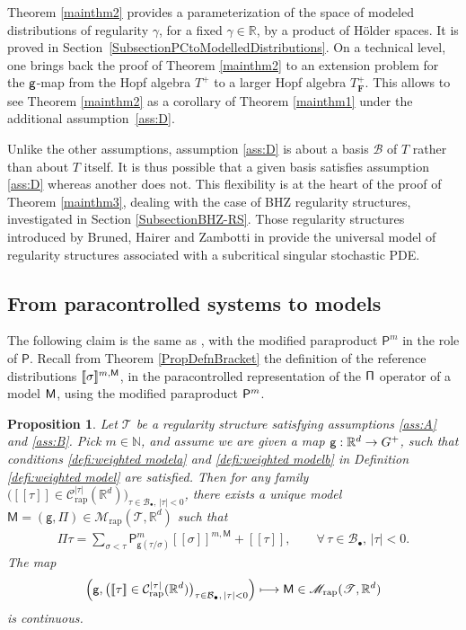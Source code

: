 \documentclass[JEP,XML,SOM,Unicode,published]{cedram}
\newcommand\mto{\mathchoice{\longmapsto}{\mapsto}{\mapsto}{\mapsto}}
\newcommand{\sbullet}{{\scriptscriptstyle\bullet}}
\theoremstyle{plain}
\newtheorem{prop}[thm]{Proposition}
\theoremstyle{definition}
\newcommand{\Brac}[1]{[\![#1]\!]}
\newcommand{\rap}{\mathrm{rap}}
\newcommand{\sfM}{\mathsf{M}}
\newcommand{\sfP}{\mathsf{P}}
\newcommand{\sfg}{\mathsf{g}}
\newcommand{\sfPi}{\mathsf{\Pi}}
\newcommand{\bsF}{\boldsymbol{F}}
\newcommand{\scrM}{\mathscr{M}}
\newcommand{\scrT}{\mathscr{T}}
\newcommand{\bbN}{\mathbb{N}}
\newcommand{\bbR}{\mathbb{R}}
\newcommand{\mcB}{\mathcal{B}}
\newcommand{\mcC}{\mathcal{C}}
\begin{document}
Theorem \ref{mainthm2} provides a parameterization of the space of modeled distributions of regularity $\gamma$, for a fixed $\gamma\in\bbR$, by a product of Hölder spaces. It is proved in Section~\ref{SubsectionPCtoModelledDistributions}. On a technical level, one brings back the proof of Theorem \ref{mainthm2} to an extension problem for the $\sf g$-map from the Hopf algebra $T^+$ to a larger Hopf algebra $T^+_{\bsF}$. This allows to see Theorem \ref{mainthm2} as a corollary of Theorem \ref{mainthm1} under the additional assumption~\eqref{ass:D}.

Unlike the other assumptions, assumption \eqref{ass:D} is about a basis $\mcB$ of $T$ rather than about $T$ itself. It is thus possible that a given basis satisfies assumption \eqref{ass:D} whereas another does not. This flexibility is at the heart of the proof of Theorem \ref{mainthm3}, dealing with the case of BHZ regularity structures, investigated in Section \ref{SubsectionBHZ-RS}. Those regularity structures introduced by Bruned, Hairer and Zambotti in \cite{BHZ} provide the universal model of regularity structures associated with a subcritical singular stochastic PDE.

\subsection{From paracontrolled systems to models}
\label{SubsectionPCtoModels}

The following claim is the same as \cite[Cor.\,15]{BH}, with the modified paraproduct $\sfP^m$ in the role of $\sfP$. Recall from Theorem \ref{PropDefnBracket} the definition of the reference distributions $\Brac{\sigma}^{m,\sf M}$, in the paracontrolled representation of the $\sf \Pi$ operator of a model $\sf M$, using the modified paraproduct ${\sf P}^m$.

\begin{prop} \label{modifiedCorUniqueExtension}
Let $\scrT$ be a regularity structure satisfying assumptions \eqref{ass:A} and \eqref{ass:B}. Pick $m\in\bbN$, and assume we are given a map ${\sf g}:\bbR^d\to G^+$, such that conditions \eqref{defi:weighted modela} and \eqref{defi:weighted modelb} in Definition \ref{defi:weighted model} are satisfied. Then for any family $\bigl(\Brac{\tau}\in \mcC_\rap^{|\tau|}(\bbR^d)\bigr)_{\tau\in\mcB_\sbullet,\, |\tau|<0}$, there exists a unique model $\sfM=(\sfg,\sfPi)\in\scrM_\rap(\scrT,\bbR^d)$ such that
\begin{align} \label{modifiedCorUniqueExtension:formula}
\sfPi\tau = \sum_{\sigma<\tau} \sfP^m_{\sfg(\tau/\sigma)}\Brac{\sigma}^{m,\sfM} + \Brac{\tau}, \qquad \forall\,\tau\in\mcB_\sbullet, \,\vert\tau\vert<0.
\end{align}
The map
\[
\Bigl(\sfg, \bigl(\Brac{\tau}\in \mcC_\rap^{|\tau|}(\bbR^d)\bigr)_{\tau\in\mcB_\sbullet,\, |\tau|<0}\Bigr) \mto {\sf M} \in \scrM_\rap(\scrT,\bbR^d)
\]
is continuous.
\end{prop}
\end{document}
